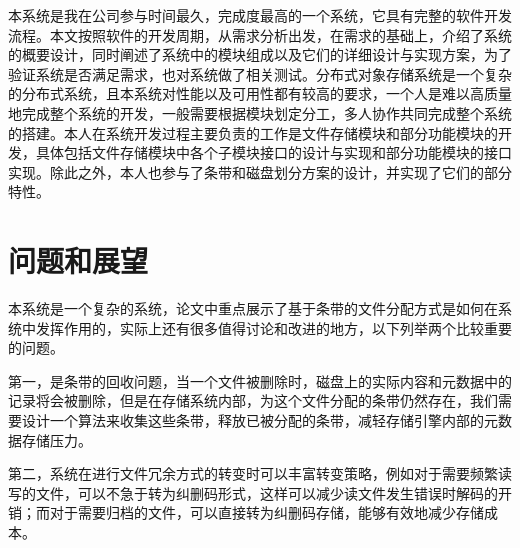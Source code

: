 本系统是我在公司参与时间最久，完成度最高的一个系统，它具有完整的软件开发流程。本文按照软件的开发周期，从需求分析出发，在需求的基础上，介绍了系统的概要设计，同时阐述了系统中的模块组成以及它们的详细设计与实现方案，为了验证系统是否满足需求，也对系统做了相关测试。分布式对象存储系统是一个复杂的分布式系统，且本系统对性能以及可用性都有较高的要求，一个人是难以高质量地完成整个系统的开发，一般需要根据模块划定分工，多人协作共同完成整个系统的搭建。本人在系统开发过程主要负责的工作是文件存储模块和部分功能模块的开发，具体包括文件存储模块中各个子模块接口的设计与实现和部分功能模块的接口实现。除此之外，本人也参与了条带和磁盘划分方案的设计，并实现了它们的部分特性。

\section{问题和展望}%
本系统是一个复杂的系统，论文中重点展示了基于条带的文件分配方式是如何在系统中发挥作用的，实际上还有很多值得讨论和改进的地方，以下列举两个比较重要的问题。

第一，是条带的回收问题，当一个文件被删除时，磁盘上的实际内容和元数据中的记录将会被删除，但是在存储系统内部，为这个文件分配的条带仍然存在，我们需要设计一个算法来收集这些条带，释放已被分配的条带，减轻存储引擎内部的元数据存储压力。

第二，系统在进行文件冗余方式的转变时可以丰富转变策略，例如对于需要频繁读写的文件，可以不急于转为纠删码形式，这样可以减少读文件发生错误时解码的开销；而对于需要归档的文件，可以直接转为纠删码存储，能够有效地减少存储成本。
